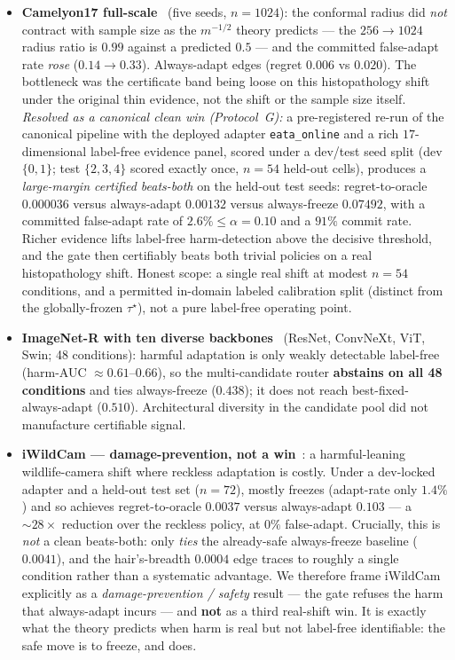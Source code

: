 \begin{itemize}
\item \textbf{Camelyon17 full-scale}~\cite{koh2021wilds} (five seeds, $n{=}1024$):
  the conformal radius did \emph{not} contract with sample size as the $m^{-1/2}$
  theory predicts --- the $256{\to}1024$ radius ratio is $0.99$ against a predicted
  $0.5$ --- and the committed false-adapt rate \emph{rose} ($0.14 \to 0.33$).
  Always-adapt edges \KGA{} (regret $0.006$ vs $0.020$).  The bottleneck was the
  certificate band being loose on this histopathology shift under the original thin
  evidence, not the shift or the sample size itself.  \emph{Resolved as a canonical
  clean win (Protocol~G):} a pre-registered re-run of the canonical \KGA{} pipeline
  with the deployed adapter \texttt{eata\_online} and a rich $17$-dimensional
  label-free evidence panel, scored under a dev/test seed split (dev $\{0,1\}$;
  test $\{2,3,4\}$ scored exactly once, $n{=}54$ held-out cells), produces a
  \emph{large-margin certified beats-both} on the held-out test seeds:
  regret-to-oracle $0.000036$ versus always-adapt $0.00132$ versus always-freeze
  $0.07492$, with a committed false-adapt rate of $2.6\%\le\alpha{=}0.10$ and a
  $91\%$ commit rate.  Richer evidence lifts label-free harm-detection above the
  decisive threshold, and the gate then certifiably beats both trivial policies on
  a real histopathology shift.  Honest scope: a single real shift at modest
  $n{=}54$ conditions, and a permitted in-domain labeled calibration split
  (distinct from the globally-frozen $\tau^\star$), not a pure label-free operating
  point.
\item \textbf{ImageNet-R with ten diverse backbones}~\cite{hendrycks2021manyfaces}
  (ResNet, ConvNeXt, ViT, Swin; 48 conditions): harmful adaptation is only weakly
  detectable label-free (harm-AUC ${\approx}0.61$--$0.66$), so the multi-candidate
  router \textbf{abstains on all 48 conditions} and ties always-freeze ($0.438$); it
  does not reach best-fixed-always-adapt ($0.510$).  Architectural diversity in the
  candidate pool did not manufacture certifiable signal.
\item \textbf{iWildCam --- damage-prevention, not a win}~\cite{koh2021wilds}: a
  harmful-leaning wildlife-camera shift where reckless adaptation is costly.  Under a
  dev-locked adapter and a held-out test set ($n{=}72$), \KGA{} mostly freezes
  (adapt-rate only $1.4\%$) and so achieves regret-to-oracle $0.0037$ versus
  always-adapt $0.103$ --- a ${\sim}28{\times}$ reduction over the reckless policy,
  at $0\%$ false-adapt.  Crucially, this is \emph{not} a clean beats-both: \KGA{}
  only \emph{ties} the already-safe always-freeze baseline ($0.0041$), and the
  hair's-breadth $0.0004$ edge traces to roughly a single condition rather than a
  systematic advantage.  We therefore frame iWildCam explicitly as a
  \emph{damage-prevention / safety} result --- the gate refuses the harm that
  always-adapt incurs --- and \textbf{not} as a third real-shift win.  It is
  exactly what the theory predicts when harm is real but not label-free
  identifiable: the safe move is to freeze, and \KGA{} does.
\end{itemize}

